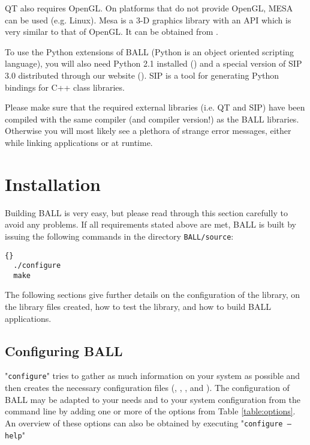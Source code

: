 QT also requires OpenGL. On platforms that do not provide OpenGL, MESA can
be used (e.g. Linux). Mesa is a 3-D graphics library with an API which is 
very similar to that of OpenGL. It can be obtained from .

To use the Python extensions of BALL (Python is an object oriented scripting
language), you will also need Python 2.1 installed
() and a special version of SIP 3.0 distributed through 
our website (). SIP is a tool for
generating Python bindings for C++ class libraries.

Please make sure that the required external \CPP libraries (i.e. QT and SIP)
have been compiled with the same compiler (and compiler version!) as the BALL
libraries. Otherwise you will most likely see a plethora of strange error
messages, either while linking applications or at runtime.

\section{Installation}
\label{section:building-ball}

Building BALL is very easy, but please read through this section carefully to
avoid any problems.  If all requirements stated above are met, BALL is built
by issuing the following commands in the directory {\tt BALL/source}:

\begin{lstlisting}{}
  ./configure
  make
\end{lstlisting}

The following sections give further details on the configuration of the library,
on the library files created, how to test the library, and how to build BALL 
applications.

\subsection{Configuring BALL}

"{\tt configure}" tries to gather as much information on your system as possible and 
then creates the necessary configuration files (,
, , and ).
The configuration of BALL may be adapted to your needs and to your system
configuration from the command line by adding one or more of the options from
Table \ref{table:options}.
An overview of these options can also be obtained by executing "{\tt configure
--help}"


